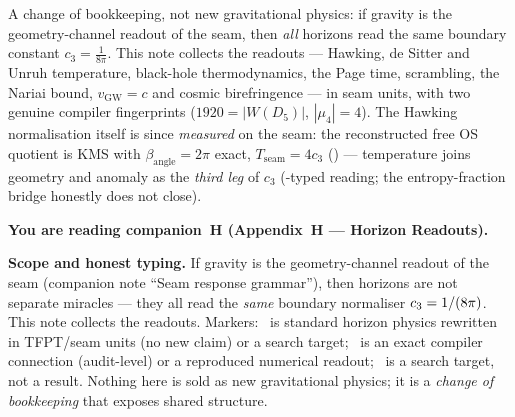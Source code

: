 
\maketitle
\vspace{-0.6cm}

\begin{keybox}
A change of bookkeeping, not new gravitational physics: if gravity is the geometry-channel readout of the
seam, then \emph{all} horizons read the same boundary constant $c_3=\tfrac1{8\pi}$. This note collects the
readouts --- Hawking, de Sitter and Unruh temperature, black-hole thermodynamics, the Page time,
scrambling, the Nariai bound, $v_{\mathrm{GW}}=c$ and cosmic birefringence --- in seam units, with two
genuine compiler fingerprints ($1920=|W(D_5)|$, $|\mu_4|=4$). The Hawking normalisation itself is
since \emph{measured} on the seam: the reconstructed free OS quotient is KMS with
$\beta_{\mathrm{angle}}=2\pi$ exact, $T_{\mathrm{seam}}=4c_3$
() --- temperature joins geometry and anomaly
as the \emph{third leg} of $c_3$ (\mC-typed reading; the entropy-fraction bridge honestly does
not close).
\end{keybox}

\tableofcontents


\noindent\textbf{You are reading \textbf{companion~H} (Appendix~H --- Horizon Readouts).}


\TFPTbadges
\TFPTclaimstack[frontier]

\bigskip

\par\smallskip\noindent\textbf{Scope and honest typing.}
If gravity is the geometry-channel readout of the seam (companion note ``Seam response grammar''), then
horizons are not separate miracles --- they all read the \emph{same} boundary normaliser $c_3=1/(8\pi)$.
This note collects the readouts. Markers: \mC\ is standard horizon physics rewritten in TFPT/seam units
(no new claim) or a search target; \mE\ is an exact compiler connection (audit-level) or a reproduced
numerical readout; \mO\ is a search target, not a result. Nothing
here is sold as new gravitational physics; it is a \emph{change of bookkeeping} that exposes shared
structure.

